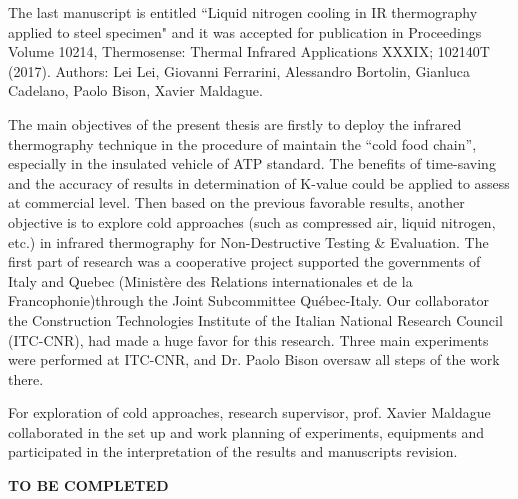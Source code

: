 The last manuscript is entitled ``Liquid nitrogen cooling in IR thermography applied to steel specimen" and it was accepted for publication in Proceedings Volume 10214, Thermosense: Thermal Infrared Applications XXXIX; 102140T (2017). Authors: Lei Lei, Giovanni Ferrarini, Alessandro Bortolin, Gianluca Cadelano, Paolo Bison, Xavier Maldague.

The main objectives of the present thesis are firstly to deploy the infrared thermography technique in the procedure of maintain the ``cold food chain'', especially in the insulated vehicle of ATP standard. The benefits of time-saving and the accuracy of results in determination of K-value could be applied to assess at commercial level. Then based on the previous favorable results, another objective is to explore cold approaches (such as compressed air, liquid nitrogen, etc.) in infrared thermography for Non-Destructive Testing \& Evaluation. The first part of research was a cooperative project supported the governments of Italy and Quebec (Ministère des Relations internationales et de la Francophonie)through the Joint Subcommittee Québec-Italy. Our collaborator the Construction Technologies Institute of the Italian National Research Council (ITC-CNR), had made a huge favor for this research. Three main experiments were performed at ITC-CNR, and Dr. Paolo Bison oversaw all steps of the work there.

For exploration of cold approaches, research supervisor, prof. Xavier Maldague collaborated in the set up and work planning of experiments, equipments and participated in the interpretation of the results and manuscripts revision.

\textbf{TO BE COMPLETED}


